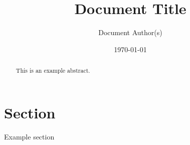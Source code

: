 \documentclass[12pt]{article}
\title{Document Title}
\author{
Document Author(s)
}
\date{\today}
\begin{document}
\maketitle

\begin{abstract}
This is an example abstract.
\end{abstract}

\section{Section}\label{sec:example}
Example section
\end{document}
